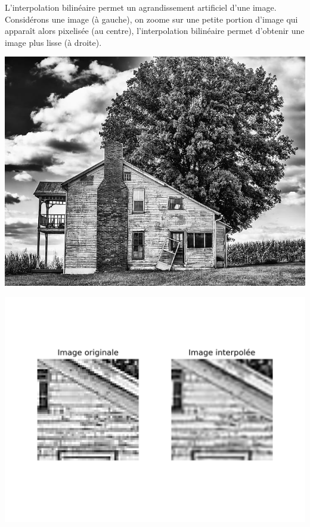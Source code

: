 \documentclass[11pt,class=report,crop=false]{standalone}
\begin{document}
L'interpolation bilinéaire permet un agrandissement artificiel d'une image.
Considérons une image (à gauche), on zoome sur une petite portion d'image qui apparaît alors pixelisée (au centre), l'interpolation bilinéaire permet d'obtenir une image plus lisse (à droite).
\begin{center}
	\begin{minipage}{0.32\textwidth}
	\includegraphics[scale=\myscale,scale=0.9]{figures/image_maison} 
	\end{minipage} 
	\begin{minipage}{0.66\textwidth}
	\includegraphics[scale=\myscale,scale=0.8,trim={0 2cm 0 2cm},clip]{figures/interpolation_bilineaire_2}  
	\end{minipage}
\end{center}
\end{document}
